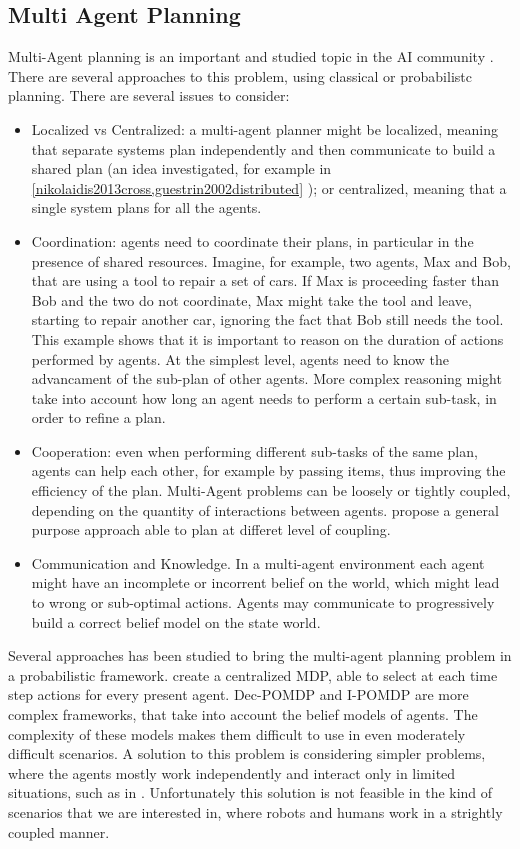 \subsection{Multi Agent Planning}
Multi-Agent planning   is an important and studied topic in the AI community \cite{durfee1999survey}. There are several approaches to this problem, using classical or probabilistc planning. There are several issues to consider:
\begin{itemize}
\item Localized vs Centralized: a multi-agent planner might be localized, meaning that separate systems plan independently and then communicate to build a shared plan (an idea investigated, for example in \ref{nikolaidis2013cross,guestrin2002distributed} ); or centralized, meaning that a single system plans for all the agents.
\item Coordination: agents need to coordinate their plans, in particular in the presence of shared resources. Imagine, for example, two agents, Max and Bob, that are using a tool to repair a set of cars. If Max is proceeding faster than Bob and the two do not coordinate, Max might take the tool and leave, starting to repair another car, ignoring the fact that Bob still needs the tool. This example shows that it is important to reason on the duration of actions performed by agents. At the simplest level, agents need to know the advancament of the sub-plan of other agents. More complex reasoning might take into account how long an agent needs to perform a certain sub-task, in order to refine a plan. 
\item Cooperation: even when performing different sub-tasks of the same plan, agents can help each other, for example by passing items, thus improving the efficiency of the plan. Multi-Agent problems can be loosely or tightly coupled, depending on the quantity of interactions between agents. \cite{torreno2015approach} propose a general purpose approach able to plan at differet level of coupling.
\item Communication and Knowledge. In a multi-agent environment each agent might have an incomplete or incorrent belief on the world, which might lead to wrong or sub-optimal actions. Agents may communicate to progressively build a correct belief model on the state world. 
\end{itemize}

Several approaches has been studied to bring the multi-agent planning problem in a probabilistic framework. \cite{boutilier1999sequential} create a centralized MDP, able to select at each time step actions for every present agent. Dec-POMDP \cite{bernstein2002complexity} and I-POMDP \cite{gmytrasiewicz2005framework} are more complex frameworks, that take into account the belief models of agents. The complexity of these models makes them difficult to use in even moderately difficult scenarios. A solution to this problem is considering simpler problems, where the agents mostly work independently and interact only in limited situations, such as in \cite{molo2013heuristic}.  Unfortunately this solution is not feasible in the kind of scenarios that we are interested in, where robots and humans work in a strightly coupled manner. 

